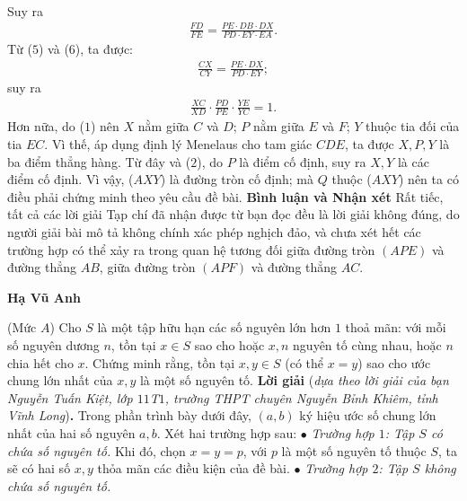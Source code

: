 \begin{multicols}{2}
\begin{align*}
	\end{align*}
	Suy ra
	\begin{align*}
		\frac{{FD}}{{FE}} = \frac{{PE \cdot DB \cdot DX}}{{PD \cdot EY \cdot EA}}. \tag{$6$}
	\end{align*}
	Từ ($5$) và ($6$), ta được:
	\begin{align*}
		\frac{{CX}}{{CY}} = \frac{{PE \cdot DX}}{{PD \cdot EY}};
	\end{align*}
	suy ra
	\begin{align*}
		\frac{{XC}}{{XD}} \cdot \frac{{PD}}{{PE}} \cdot \frac{{YE}}{{YC}} = 1.
	\end{align*}
	Hơn nữa, do ($1$) nên $X$ nằm giữa $C$ và $D$; $P$ nằm giữa $E$ và $F$; $Y$ thuộc tia đối của tia $EC$.
	\vskip 0.05cm
	Vì thế, áp dụng định lý Menelaus cho tam giác $CDE$, ta được $X, P, Y$ là ba điểm thẳng hàng. Từ đây và ($2$), do $P$ là điểm cố định, suy ra $X, Y$ là các điểm cố định. Vì vậy, ($AXY$) là đường tròn cố định; mà $Q$ thuộc ($AXY$) nên ta có điều phải chứng minh theo yêu cầu đề bài.
	\vskip 0.05cm
	\textbf{\color{thachthuctoanhoc}Bình luận và Nhận xét}
	\vskip 0.05cm
	Rất tiếc, tất cả các lời giải Tạp chí đã nhận được từ bạn đọc đều là lời giải không đúng, do người giải bài mô tả không chính xác phép nghịch đảo, và chưa xét hết các trường hợp có thể xảy ra trong quan hệ tương đối giữa đường tròn $(APE)$ và đường thẳng $AB$, giữa đường tròn $(APF)$ và đường thẳng $AC$.
	\begin{flushright}
		\textbf{\color{thachthuctoanhoc}Hạ Vũ Anh}
	\end{flushright}
	{}
	(Mức $A$) Cho $S$ là một tập hữu hạn các số nguyên lớn hơn $1$ thoả mãn: với mỗi số nguyên dương $n$, tồn tại $x\in S$ sao cho  hoặc $x,n$ nguyên tố cùng nhau, hoặc $n$ chia hết cho $x$.  Chứng minh rằng, tồn tại $x,y\in S$ (có thể $x=y$) sao cho ước chung lớn nhất của $x,y$ là một số nguyên tố. 
	\vskip 0.05cm
	\textbf{\color{thachthuctoanhoc}Lời giải} (\textit{dựa theo lời giải của bạn Nguyễn Tuấn Kiệt, lớp $11$T$1$, trường THPT chuyên Nguyễn Bỉnh Khiêm, tỉnh Vĩnh Long})\textbf{\color{thachthuctoanhoc}.}
	\vskip 0.05cm
	Trong phần trình bày dưới đây, $(a, b)$ ký hiệu ước số chung lớn nhất của hai số nguyên $a, b$.
	\vskip 0.05cm
	Xét hai trường hợp sau:
	\vskip 0.05cm
	$\bullet$ \textit{Trường hợp $1$: Tập $S$ có chứa số nguyên tố.}
	\vskip 0.05cm
	Khi đó, chọn $x = y = p$, với $p$ là một số nguyên tố thuộc $S$, ta sẽ có hai số $x, y$ thỏa mãn các điều kiện của đề bài.
	\vskip 0.05cm
	$\bullet$ \textit{Trường hợp $2$: Tập $S$ không chứa số nguyên tố.}

\end{multicols}
